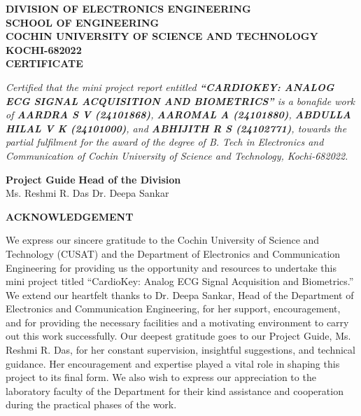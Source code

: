 \documentclass[12pt,a4paper]{report}
\begin{document}
\newpage
{}
\begin{center}
\large \textbf{DIVISION OF ELECTRONICS ENGINEERING}\\ \textbf{SCHOOL OF ENGINEERING}\\ \textbf{COCHIN UNIVERSITY OF SCIENCE AND TECHNOLOGY}\\ \textbf{KOCHI-682022}\\[1.5cm]

\Large \textbf{CERTIFICATE}\\[1cm]
\end{center}

\large \textit{Certified that the mini project report entitled \textbf{“CARDIOKEY: ANALOG ECG SIGNAL ACQUISITION AND BIOMETRICS”} is a bonafide work of \textbf{AARDRA S V (24101868)}, \textbf{AAROMAL A (24101880)}, \textbf{ABDULLA HILAL V K (24101000)}, and \textbf{ABHIJITH R S (24102771)}, towards the partial fulfilment for the award of the degree of B. Tech in Electronics and Communication of Cochin University of Science and Technology, Kochi-682022.}

\vspace{3cm}
\textbf{Project Guide} \hfill \textbf{Head of the Division}\\[0.5cm]
Ms. Reshmi R. Das \hfill Dr. Deepa Sankar

\newpage
\begin{center}
\Large \textbf{ACKNOWLEDGEMENT}\\[1cm]
\end{center}

We express our sincere gratitude to the Cochin University of Science and Technology (CUSAT) and the Department of Electronics and Communication Engineering for providing us the opportunity and resources to undertake this mini project titled “CardioKey: Analog ECG Signal Acquisition and Biometrics.” \\

We extend our heartfelt thanks to Dr. Deepa Sankar, Head of the Department of Electronics and Communication Engineering, for her support, encouragement, and for providing the necessary facilities and a motivating environment to carry out this work successfully. Our deepest gratitude goes to our Project Guide, Ms. Reshmi R. Das, for her constant supervision, insightful suggestions, and technical guidance. Her encouragement and expertise played a vital role in shaping this project to its final form. We also wish to express our appreciation to the laboratory faculty of the Department for their kind assistance and cooperation during the practical phases of the work. \\
\end{document}
